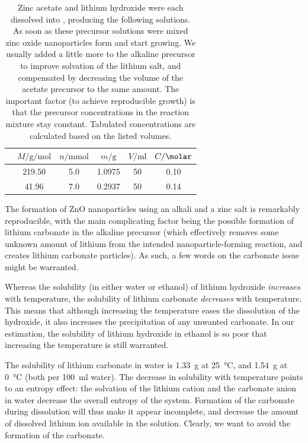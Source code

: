 \documentclass[9pt,twoside,twocolumn]{article}\usepackage{knitr}
\begin{document}
\begin{refsection}
\begin{table}[tb]
\centering
\caption{Zinc acetate and lithium hydroxide were each dissolved into , producing the following solutions. As soon as these precursor solutions were mixed zinc oxide nanoparticles form and start growing. We usually added a little more  to the alkaline precursor to improve solvation of the lithium salt, and compensated by decreasing the volume of the acetate precursor to the same amount. The important factor (to achieve reproducible  growth) is that the precursor concentrations in the reaction mixture stay constant. Tabulated concentrations are calculated based on the listed volumes.}
\label{tabsi:precursor-solutions}
\begin{tabular}{lS[table-format=3.2]S[table-format=1.1]S[table-format=1.4]S[table-format=2.0]S[table-format=1.2]}\toprule
 & $M/\unit{\gram\per\mole}$ & $n/\unit{\milli\mole}$ & $m/\unit{\gram}$ & $V/\unit{\ml}$ & $C/\unit{\molar}$\\\midrule
{} & 219.50 & 5.0 & 1.0975 & 50 & 0.10 \\
      &  41.96 & 7.0 & 0.2937 & 50 & 0.14 \\
\bottomrule
\end{tabular}
\end{table}


The formation of ZnO nanoparticles using an alkali and a zinc salt is remarkably reproducible, with the main complicating factor being the possible formation of lithium carbonate in the alkaline precursor (which effectively removes some unknown amount of lithium from the intended nanoparticle-forming reaction, and creates lithium carbonate particles). As such, a few words on the carbonate issue might be warranted.

Whereas the solubility (in either water or ethanol) of lithium hydroxide \emph{increases} with temperature, the solubility of lithium carbonate \emph{decreases} with temperature. This means that although increasing the temperature eases the dissolution of the hydroxide, it also increases the precipitation of any unwanted carbonate. In our estimation, the solubility of lithium hydroxide in ethanol is so poor that increasing the temperature is still warranted.

The solubility of lithium carbonate in water is \qty{1.33}{\gram} at \qty{25}{\degreeCelsius}, and \qty{1.54}{\gram} at \qty{0}{\degreeCelsius} (both per \qty{100}{\ml} water). The decrease in solubility with temperature points to an entropy effect: the solvation of the lithium cation and the carbonate anion in water decrease the overall entropy of the system. 
Formation of the carbonate during dissolution will thus make it appear incomplete, and decrease the amount of dissolved lithium ion available in the solution. Clearly, we want to avoid the formation of the carbonate.


\end{refsection}
\end{document}
